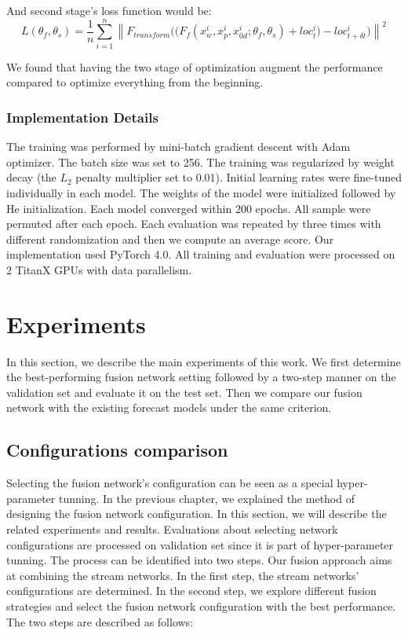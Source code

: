 \begin{enumerate}[leftmargin=2em]
	And second stage's loss function would be:
	\begin{equation}
	\label{eq_fusion_2}
	L(\theta_{f}, \theta_{s}) = \frac{1}{n}\sum_{i=1}^{n} \left \| {F_{transform}((F_{f}(x_w^i, x_p^i, x_{0d}^i; \theta_{f}, \theta_{s})} + loc^i_{t} ) - loc^i_{t+\delta t} ) \right \| ^2
	\end{equation}
	
	 We found that having the two stage of optimization augment the performance compared to optimize everything from the beginning. 

	 
	
	
	
\end{enumerate}



\subsection{Implementation Details}

The training was performed by mini-batch gradient descent with Adam optimizer. The batch size was set to 256. The training was regularized by weight decay (the $L_2$ penalty multiplier set to 0.01). Initial learning rates were fine-tuned individually in each model. The weights of the model were initialized followed by He initialization\cite{he2015delving}. Each model converged within 200 epochs. All sample were permuted after each epoch. Each evaluation was repeated by three times with different randomization and then we compute an average score. Our implementation used PyTorch 4.0. All training and evaluation were processed on 2 TitanX GPUs with data parallelism\cite{KRIZHEVSKY2014}. 


\chapter{Experiments}
In this section, we describe the main experiments of this work. We first determine the best-performing fusion network setting followed by a two-step manner on the validation set and evaluate it on the test set. Then we compare our fusion network with the existing forecast models under the same criterion. 

\section{Configurations comparison}
Selecting the fusion network's configuration can be seen as a special hyper-parameter tunning. In the previous chapter, we explained the method of designing the fusion network configuration. In this section, we will describe the related experiments and results. Evaluations about selecting network configurations are processed on validation set since it is part of hyper-parameter tunning. The process can be identified into two steps. Our fusion approach aims at combining the stream networks. In the first step, the stream networks' configurations are determined. In the second step, we explore different fusion strategies and select the fusion network configuration with the best performance. The two steps are described as follows:
